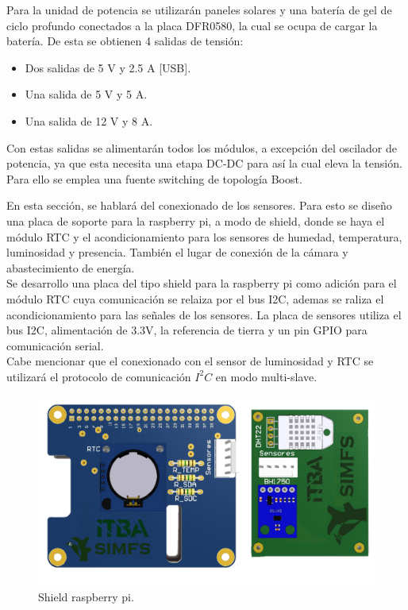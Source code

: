 
Para la unidad de potencia se utilizarán paneles solares y una batería de gel de ciclo profundo conectados a la placa DFR0580, la cual se ocupa de cargar la batería. De esta se obtienen 4 salidas de tensión:
\begin{itemize}
	\item Dos salidas de 5 V y 2.5 A [USB].
	\item Una salida de 5 V y 5 A.
	\item Una salida de 12 V y 8 A.
\end{itemize}

Con estas salidas se alimentarán todos los módulos, a excepción del oscilador de potencia, ya que esta necesita una etapa DC-DC para así la cual eleva la tensión. Para ello se emplea una fuente switching de topología Boost.


En esta sección, se hablará del conexionado de los sensores.
Para esto se diseño una placa de soporte para la raspberry pi, a modo de shield, donde se haya el módulo RTC y el acondicionamiento para los sensores de humedad, temperatura, luminosidad y presencia. También el lugar de conexión de la cámara y abastecimiento de energía.\\
Se desarrollo una placa del tipo shield para la raspberry pi como adición para el módulo RTC cuya comunicación se relaiza por el bus I2C, ademas se raliza el acondicionamiento para las señales de los sensores. La placa de sensores utiliza el bus I2C, alimentación de 3.3V, la referencia de tierra y un pin GPIO para comunicación serial.\\
Cabe mencionar que el conexionado con el sensor de luminosidad y RTC se utilizará el protocolo de comunicación $I^2C$ en modo multi-slave.

\begin{figure}[H]
	\centering
	\includegraphics[width=0.9\linewidth,page=1]{ImagenesIngenieria de Detalle/RPI}		
	\caption{Shield raspberry pi.}
	\label{fig:conexionado_Rpi}
\end{figure}

